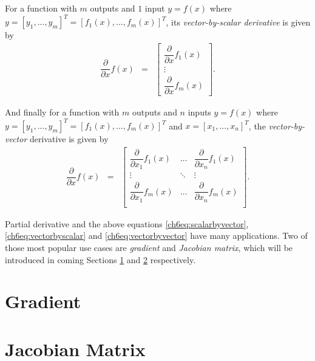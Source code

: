 For a function with $m$ outputs and $1$ input $y=f(x)$ where $y = \left[y_1,...,y_m\right]^T = \left[f_1(x),...,f_m(x)\right]^T$, its \textit{vector-by-scalar derivative} is given by
\begin{eqnarray}
	\dfrac{\partial}{\partial x}f(x) &=& \left[\begin{array}{c}
	\dfrac{\partial}{\partial x}f_1(x) \\
	\vdots \\
	\dfrac{\partial}{\partial x}f_m(x)
	\end{array}\right]. \label{ch6eq:vectorbyscalar}
\end{eqnarray}

And finally for a function with $m$ outputs and $n$ inputs $y=f(x)$ where $y = \left[y_1,...,y_m\right]^T = \left[f_1(x),...,f_m(x)\right]^T$ and $x = \left[x_1,...,x_n\right]^T$, the \textit{vector-by-vector} derivative is given by
\begin{eqnarray}
	\dfrac{\partial}{\partial x}f(x) &=& \left[\begin{array}{ccc}
	\dfrac{\partial}{\partial x_1}f_1(x) & \ldots & \dfrac{\partial}{\partial x_n}f_1(x) \\
	\vdots & \ddots & \vdots \\
	\dfrac{\partial}{\partial x_1}f_m(x) & \ldots & \dfrac{\partial}{\partial x_n}f_m(x) \\
	\end{array}\right]. \label{ch6eq:vectorbyvector}
\end{eqnarray}

Partial derivative and the above equations \eqref{ch6eq:scalarbyvector}, \eqref{ch6eq:vectorbyscalar} and \eqref{ch6eq:vectorbyvector} have many applications. Two of those most popular use cases are \textit{gradient} and \textit{Jacobian matrix}, which will be introduced in coming Sections \ref{ch6sec:gradient} and \ref{ch6sec:jacobianmatrix} respectively.

\section{Gradient} \label{ch6sec:gradient}








\section{Jacobian Matrix} \label{ch6sec:jacobianmatrix}
